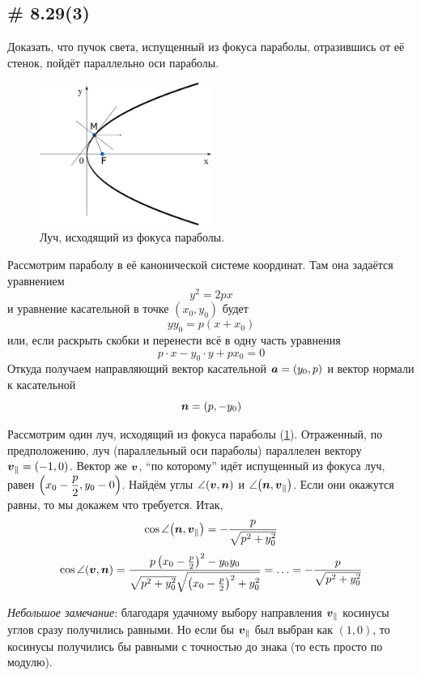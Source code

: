 \documentclass[a4paper,12pt]{article}
\begin{document}
  
  \subsection{\# 8.29(3)}
  
  Доказать, что пучок света, испущенный из фокуса параболы, отразившись от её стенок, пойдёт параллельно оси параболы.
  
  \begin{solution}
    \begin{figure}[h]
      \centering

      \includegraphics[width=0.5\textwidth]{parabola-8-29}
    
      \caption{Луч, исходящий из фокуса параболы.}
      \label{fig:parabola-8-29}
    \end{figure}
    
    Рассмотрим параболу в её канонической системе координат.
    Там она задаётся уравнением
    \[
      y^2 = 2px
    \]
    и уравнение касательной в точке $(x_0, y_0)$ будет
    \[
      y y_0 = p(x + x_0)
    \]
    или, если раскрыть скобки и перенести всё в одну часть уравнения
    \[
      p \cdot x - y_0 \cdot y + px_0 = 0
    \]
    Откуда получаем направляющий вектор касательной $\bds a \hm= (y_0, p)$ и вектор нормали к касательной
    \[
      \bds n \hm= (p, -y_0)
    \]
    
    Рассмотрим один луч, исходящий из фокуса параболы (\ref{fig:parabola-8-29}).
    Отраженный, по предположению, луч (параллельный оси параболы) параллелен вектору $\bds v_{\parallel} \hm= (-1, 0)$.
    Вектор же $\boldsymbol v$, ``по которому'' идёт испущенный из фокуса луч, равен $\left(x_0 \hm- \dfrac{p}{2}, y_0 \hm- 0\right)$.
    Найдём углы $\angle{(\boldsymbol v, \boldsymbol n)}$ и $\angle{\left(\boldsymbol n, \boldsymbol v_{\parallel}\right)}$.
    Если они окажутся равны, то мы докажем что требуется.
    Итак,
    \[
      \cos \angle{\left(\boldsymbol n, \boldsymbol v_{\parallel}\right)} = -\frac{p}{\sqrt{p^2 + y_0^2}}
    \]
    \[
      \cos \angle{(\boldsymbol v, \boldsymbol n)} = \frac{p \left(x_0 - \frac{p}{2}\right)^2 - y_0 y_0}{\sqrt{p^2 + y_0^2} \sqrt{\left(x_0 - \frac{p}{2}\right)^2 + y_0^2}} = \ldots = -\frac{p}{\sqrt{p^2 + y_0^2}}
    \]
    
    \medskip
    
    \emph{Небольшое замечание}: благодаря удачному выбору направления $\boldsymbol v_{\parallel}$ косинусы углов сразу получились равными.
    Но если бы $\boldsymbol v_{\parallel}$ был выбран как $(1, 0)$, то косинусы получились бы равными с точностью до знака (то есть просто по модулю).
  \end{solution}
  
\end{document}
